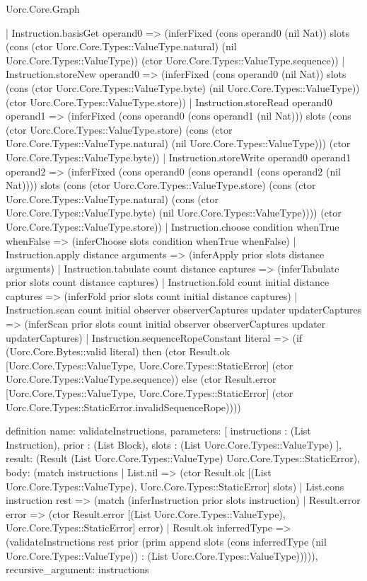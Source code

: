 \begin{lexlean}{Uorc.Core.Graph}
\begin{semanticmodule}
{    | Instruction.basisGet operand0 => (inferFixed (cons operand0 (nil Nat)) slots (cons (ctor Uorc.Core.Types::ValueType.natural) (nil Uorc.Core.Types::ValueType)) (ctor Uorc.Core.Types::ValueType.sequence))
    | Instruction.storeNew operand0 => (inferFixed (cons operand0 (nil Nat)) slots (cons (ctor Uorc.Core.Types::ValueType.byte) (nil Uorc.Core.Types::ValueType)) (ctor Uorc.Core.Types::ValueType.store))
    | Instruction.storeRead operand0 operand1 => (inferFixed (cons operand0 (cons operand1 (nil Nat))) slots (cons (ctor Uorc.Core.Types::ValueType.store) (cons (ctor Uorc.Core.Types::ValueType.natural) (nil Uorc.Core.Types::ValueType))) (ctor Uorc.Core.Types::ValueType.byte))
    | Instruction.storeWrite operand0 operand1 operand2 => (inferFixed (cons operand0 (cons operand1 (cons operand2 (nil Nat)))) slots (cons (ctor Uorc.Core.Types::ValueType.store) (cons (ctor Uorc.Core.Types::ValueType.natural) (cons (ctor Uorc.Core.Types::ValueType.byte) (nil Uorc.Core.Types::ValueType)))) (ctor Uorc.Core.Types::ValueType.store))
    | Instruction.choose condition whenTrue whenFalse => (inferChoose slots condition whenTrue whenFalse)
    | Instruction.apply distance arguments => (inferApply prior slots distance arguments)
    | Instruction.tabulate count distance captures => (inferTabulate prior slots count distance captures)
    | Instruction.fold count initial distance captures => (inferFold prior slots count initial distance captures)
    | Instruction.scan count initial observer observerCaptures updater updaterCaptures => (inferScan prior slots count initial observer observerCaptures updater updaterCaptures)
    | Instruction.sequenceRopeConstant literal => (if (Uorc.Core.Bytes::valid literal) then (ctor Result.ok [Uorc.Core.Types::ValueType, Uorc.Core.Types::StaticError] (ctor Uorc.Core.Types::ValueType.sequence)) else (ctor Result.error [Uorc.Core.Types::ValueType, Uorc.Core.Types::StaticError] (ctor Uorc.Core.Types::StaticError.invalidSequenceRope))))
}

definition{
  name: validateInstructions,
  parameters: [
    instructions : (List Instruction),
    prior : (List Block),
    slots : (List Uorc.Core.Types::ValueType)
  ],
  result: (Result (List Uorc.Core.Types::ValueType) Uorc.Core.Types::StaticError),
  body: (match instructions
    | List.nil => (ctor Result.ok [(List Uorc.Core.Types::ValueType), Uorc.Core.Types::StaticError] slots)
    | List.cons instruction rest => (match (inferInstruction prior slots instruction)
      | Result.error error => (ctor Result.error [(List Uorc.Core.Types::ValueType), Uorc.Core.Types::StaticError] error)
      | Result.ok inferredType => (validateInstructions rest prior (prim append slots (cons inferredType (nil Uorc.Core.Types::ValueType)) : (List Uorc.Core.Types::ValueType))))),
  recursive_argument: instructions
}


\end{semanticmodule}
\end{lexlean}
